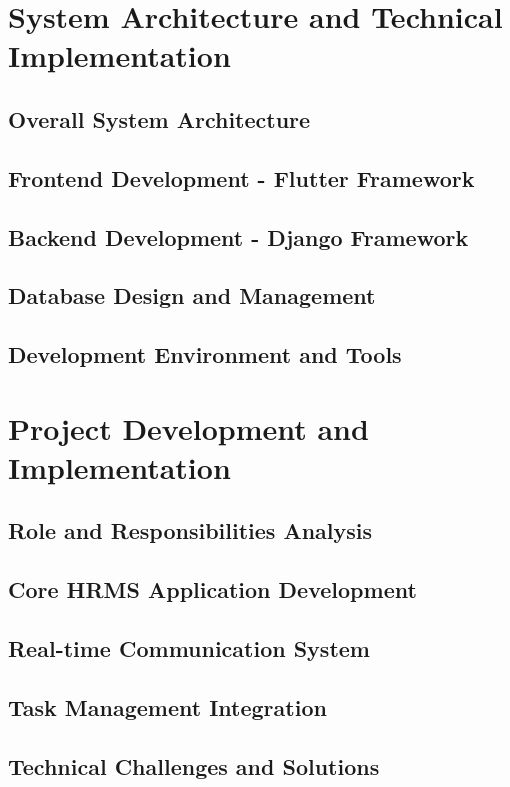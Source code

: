 \documentclass[a4paper, 11pt, oneside]{report}
\begin{document}
\chapter{System Architecture and Technical Implementation}
  \section{Overall System Architecture}
  \section{Frontend Development - Flutter Framework}
  \section{Backend Development - Django Framework}
  \section{Database Design and Management}
  \section{Development Environment and Tools}
  

\chapter{Project Development and Implementation}
  \section{Role and Responsibilities Analysis}
  \section{Core HRMS Application Development}
  \section{Real-time Communication System}
  \section{Task Management Integration}
  \section{Technical Challenges and Solutions}
  
\end{document}
